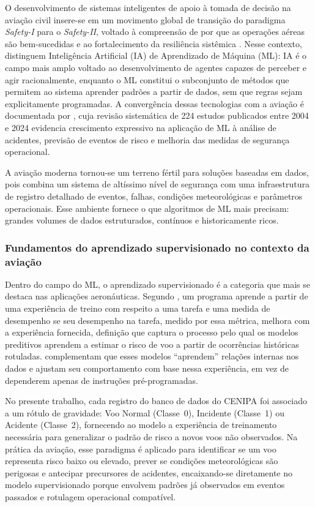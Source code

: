 \documentclass[english,brazilian]{UNISINOSartigo}
\begin{document}
O desenvolvimento de sistemas inteligentes de apoio à tomada de decisão na
aviação civil insere-se em um movimento global de transição do paradigma
\textit{Safety-I} para o \textit{Safety-II}, voltado à compreensão de por que as
operações aéreas são bem-sucedidas e ao fortalecimento da resiliência sistêmica
\cite{ZIAKKAS2024}. Nesse contexto,  distinguem Inteligência
Artificial (IA) de Aprendizado de Máquina (ML): IA é o campo mais amplo voltado
ao desenvolvimento de agentes capazes de perceber e agir racionalmente, enquanto
o ML constitui o subconjunto de métodos que permitem ao sistema aprender padrões
a partir de dados, sem que regras sejam explicitamente programadas. A convergência
dessas tecnologias com a aviação é documentada por , cuja
revisão sistemática de 224 estudos publicados entre 2004 e 2024 evidencia
crescimento expressivo na aplicação de ML à análise de acidentes, previsão de
eventos de risco e melhoria das medidas de segurança operacional.

A aviação moderna tornou-se um terreno fértil para soluções baseadas em dados,
pois combina um sistema de altíssimo nível de segurança com uma infraestrutura de
registro detalhado de eventos, falhas, condições meteorológicas e parâmetros
operacionais. Esse ambiente fornece o que algoritmos de ML mais precisam: grandes
volumes de dados estruturados, contínuos e historicamente ricos.

\subsubsection{Fundamentos do aprendizado supervisionado no contexto da aviação}

Dentro do campo do ML, o aprendizado supervisionado é a categoria que mais
se destaca nas aplicações aeronáuticas. Segundo , um
programa aprende a partir de uma experiência de treino com respeito a uma tarefa e
uma medida de desempenho se seu desempenho na tarefa, medido por essa métrica,
melhora com a experiência fornecida, definição que captura o processo pelo qual
os modelos preditivos aprendem a estimar o risco de voo a partir de ocorrências
históricas rotuladas.  complementam que esses modelos
``aprendem'' relações internas nos dados e ajustam seu comportamento com base
nessa experiência, em vez de dependerem apenas de instruções pré-programadas.

No presente trabalho, cada registro do banco de dados do CENIPA \cite{CENIPA2025}
foi associado a um rótulo de gravidade: Voo Normal (Classe~0), Incidente
(Classe~1) ou Acidente (Classe~2), fornecendo ao
modelo a experiência de treinamento necessária para generalizar o padrão de risco
a novos voos não observados. Na prática da aviação, esse paradigma é aplicado para
identificar se um voo representa risco baixo ou elevado, prever se condições
meteorológicas são perigosas e antecipar precursores de acidentes, encaixando-se
diretamente no modelo supervisionado porque envolvem padrões já observados
em eventos passados e rotulagem operacional compatível.
\end{document}

